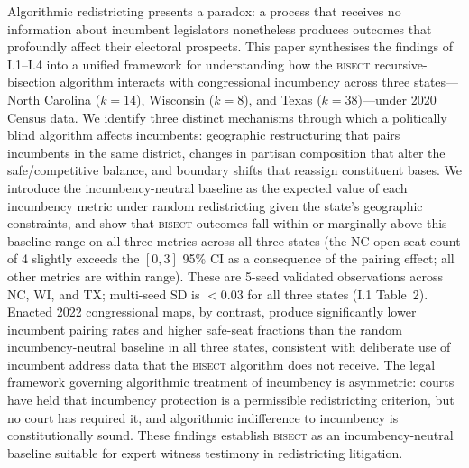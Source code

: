 Algorithmic redistricting presents a paradox: a process that receives no information
about incumbent legislators nonetheless produces outcomes that profoundly affect their
electoral prospects. This paper synthesises the findings of I.1--I.4 into a unified
framework for understanding how the \textsc{bisect} recursive-bisection algorithm
interacts with congressional incumbency across three states---North Carolina ($k=14$),
Wisconsin ($k=8$), and Texas ($k=38$)---under 2020 Census data. We identify three
distinct mechanisms through which a politically blind algorithm affects incumbents:
geographic restructuring that pairs incumbents in the same district, changes in
partisan composition that alter the safe/competitive balance, and boundary shifts
that reassign constituent bases. We introduce the incumbency-neutral baseline as the
expected value of each incumbency metric under random redistricting given the state's
geographic constraints, and show that \textsc{bisect} outcomes fall within or
marginally above this baseline range on all three metrics across all three states
(the NC open-seat count of 4 slightly exceeds the $[0,3]$ 95\% CI as a consequence
of the pairing effect; all other metrics are within range). These are
5-seed validated observations across NC, WI, and TX; multi-seed SD is $< 0.03$ for
all three states (I.1 Table~2). Enacted 2022 congressional maps, by contrast, produce significantly lower
incumbent pairing rates and higher safe-seat fractions than the random incumbency-neutral
baseline in all three states, consistent with deliberate use of incumbent address data
that the \textsc{bisect} algorithm does not receive. The legal framework governing algorithmic treatment of incumbency is asymmetric:
courts have held that incumbency protection is a permissible redistricting criterion,
but no court has required it, and algorithmic indifference to incumbency is
constitutionally sound. These findings establish \textsc{bisect} as an incumbency-neutral
baseline suitable for expert witness testimony in redistricting litigation.
